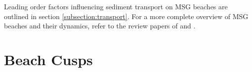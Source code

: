 Leading order factors influencing sediment transport on MSG beaches are outlined in section \ref{subsection:transport}. For a more complete overview of MSG beaches and their dynamics, refer to the review papers of \citet{Kirk1980} and \citet{Mason_Coates2001}. %



\section{Beach Cusps}

%
%
%
%


